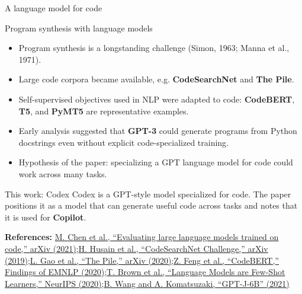 \documentclass[aspectratio=43,9pt]{beamer}
\newcommand{\srclink}[2]{\href{#2}{\textcolor{black!68}{#1}}}
\newcommand{\sep}{;\hspace{0.35em}}
\newcommand{\refline}[2][References]{%
  \vfill
  {\raggedright\fontsize{5.1}{5.5}\selectfont\color{black!68}\textbf{#1:} #2\par}%
}
\newcommand{\srcChen}{\srclink{M. Chen et al., ``Evaluating large language models trained on code,'' arXiv (2021)}{https://arxiv.org/abs/2107.03374}}
\newcommand{\srcHusain}{\srclink{H. Husain et al., ``CodeSearchNet Challenge,'' arXiv (2019)}{https://arxiv.org/abs/1909.09436}}
\newcommand{\srcGao}{\srclink{L. Gao et al., ``The Pile,'' arXiv (2020)}{https://arxiv.org/abs/2101.00027}}
\newcommand{\srcFeng}{\srclink{Z. Feng et al., ``CodeBERT,'' Findings of EMNLP (2020)}{https://arxiv.org/abs/2002.08155}}
\newcommand{\srcBrown}{\srclink{T. Brown et al., ``Language Models are Few-Shot Learners,'' NeurIPS (2020)}{https://arxiv.org/abs/2005.14165}}
\newcommand{\srcWang}{\srclink{B. Wang and A. Komatsuzaki, ``GPT-J-6B'' (2021)}{https://arankomatsuzaki.wordpress.com/2021/06/04/gpt-j/}}
\begin{document}
\begin{frame}{A language model for code}
\small
\begin{block}{Program synthesis with language models}
\begin{itemize}
  \item Program synthesis is a longstanding challenge (Simon, 1963; Manna et al., 1971).
  \item Large code corpora became available, e.g. \textbf{CodeSearchNet} and \textbf{The Pile}.
  \item Self-supervised objectives used in NLP were adapted to code: \textbf{CodeBERT}, \textbf{T5}, and \textbf{PyMT5} are representative examples.
  \item Early analysis suggested that \textbf{GPT-3} could generate programs from Python docstrings even without explicit code-specialized training.
  \item Hypothesis of the paper: specializing a GPT language model for code could work across many tasks.
\end{itemize}
\end{block}

\begin{exampleblock}{This work: Codex}
Codex is a GPT-style model specialized for code. The paper positions it as a model that can generate useful code across tasks and notes that it is used for \textbf{Copilot}.
\end{exampleblock}

\refline{\srcChen\sep \srcHusain\sep \srcGao\sep \srcFeng\sep \srcBrown\sep \srcWang}
\end{frame}
\end{document}
